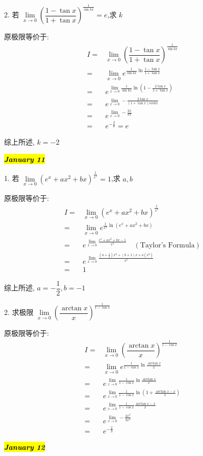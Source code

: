 2. 若 $\lim\limits_{x\to 0}\left(\dfrac{1-\tan x}{1+\tan x}\right)^{\frac{1}{\sin kx}}=e$,求 $k$
\begin{solution}
	
	原极限等价于:
	\begin{align*}
		I = & \lim\limits_{x\to 0}\left(\dfrac{1-\tan x}{1+\tan x} \right)^{\frac{1}{\sin kx}} \\
		  = & \lim\limits_{x\to 0}e^{\frac{1}{\sin kx}\ln\frac{1-\tan x}{1+\tan x}}\\
		  = & e^{\lim\limits_{x\to 0}\frac{1}{\sin kx}\ln(1-\frac{2\tan x}{1+\tan x})}\\
		  = & e^{\lim\limits_{x\to 0}-\frac{2\tan x}{(1+\tan x)sin kx}}\\
		  = & e^{\lim\limits_{x\to 0}-\frac{2x}{kx}}\\
		  = & e^{-\frac{2}{k}} = e
	\end{align*}

	综上所述, $k = -2$
\end{solution}
\hl{\textbf{\textit{January 11}}}

1.  若 $\lim\limits_{x\to 0}(e^{x}+ax^{2}+bx)^{\frac{1}{x^{2}}}=1$,求 $a,b$
\begin{solution}
	
	原极限等价于:
	\begin{align*}
		I = & \lim\limits_{x\to 0}(e^{x}+ax^{2}+bx)^{\frac{1}{x^{2}}}\\
		  = & \lim\limits_{x\to 0}e^{\frac{1}{x^{2}}\ln(e^{x}+ax^{2}+bx)}\\
		  = & e^{\lim\limits_{x\to 0}\frac{e^{x}+ax^{2}+bx-1}{x^{2}}}\quad (\text{Taylor's Formula})\\
		  = & e^{\lim\limits_{x\to 0}\frac{(a+\frac{1}{2})x^{2}+(b+1)x+o(x^{2})}{x^{2}}}\\
		  = & 1
	\end{align*}

	综上所述, $a = -\dfrac{1}{2}, b = -1$
\end{solution}

2. 求极限 $\lim\limits_{x\to 0}\left(\dfrac{\arctan x}{x}\right)^{\frac{1}{1-\cos x}}$
\begin{solution}
	
	原极限等价于:
	\begin{align*}
		I = & \lim\limits_{x\to 0}\left(\dfrac{\arctan x}{x}\right)^{\frac{1}{1-\cos x}}\\
		  = & \lim\limits_{x\to 0}e^{\frac{1}{1-\cos x}\ln\frac{\arctan x}{x}}\\
		  = & e^{\lim\limits_{x\to 0}\frac{1}{1-\cos x}\ln\frac{\arctan x}{x}}\\
		  = & e^{\lim\limits_{x\to 0}\frac{1}{1-\cos x}\ln(1+\frac{\arctan x-x}{x})}\\
		  = & e^{\lim\limits_{x\to 0}\frac{1}{1-\cos x}\frac{\arctan x-x}{x}}\\
		  = & e^{\lim\limits_{x\to 0}-\frac{2x^{3}}{3x^{3}}}\\
		  = & e^{-\frac{2}{3}}
	\end{align*}
\end{solution}
\hl{\textbf{\textit{January 12}}}

